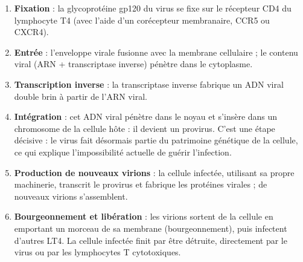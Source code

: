 \documentclass[11pt]{article}
\newcommand{\cle}[1]{{\popxbold\color{popdark}#1}}
\begin{document}
\begin{enumerate}
\item \textbf{Fixation} : la glycoprotéine gp120 du virus se fixe sur le récepteur \cle{CD4} du lymphocyte T4 (avec l'aide d'un corécepteur membranaire, CCR5 ou CXCR4).
\item \textbf{Entrée} : l'enveloppe virale fusionne avec la membrane cellulaire ; le contenu viral (ARN + transcriptase inverse) pénètre dans le cytoplasme.
\item \textbf{Transcription inverse} : la transcriptase inverse fabrique un \cle{ADN} viral double brin à partir de l'ARN viral.
\item \textbf{Intégration} : cet ADN viral pénètre dans le noyau et s'insère dans un chromosome de la cellule hôte : il devient un \cle{provirus}. C'est une étape décisive : le virus fait désormais partie du patrimoine génétique de la cellule, ce qui explique l'impossibilité actuelle de guérir l'infection.
\item \textbf{Production de nouveaux virions} : la cellule infectée, utilisant sa propre machinerie, transcrit le provirus et fabrique les protéines virales ; de nouveaux virions s'assemblent.
\item \textbf{Bourgeonnement et libération} : les virions sortent de la cellule en emportant un morceau de sa membrane (bourgeonnement), puis infectent d'autres LT4. La cellule infectée finit par être détruite, directement par le virus ou par les lymphocytes T cytotoxiques.
\end{enumerate}
\end{document}
